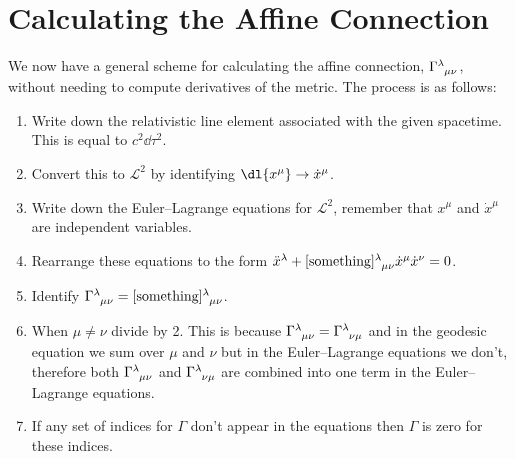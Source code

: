 \documentclass[fleqn]{NotesClass}
\newcommand*{\christoffel}[3]{\tensor{\Gamma}{^{#1}_{{#2}{#3}}}}
\newcommand*{\lagrangian}{\mathcal{L}}
\begin{document}
    \section{Calculating the Affine Connection}
    We now have a general scheme for calculating the affine connection, \(\christoffel{\lambda}{\mu}{\nu}\), without needing to compute derivatives of the metric.
    The process is as follows:
    \begin{enumerate}
        \item Write down the relativistic line element associated with the given spacetime.
        This is equal to \(c^2\dd{\tau}^2\).
        \item Convert this to \(\lagrangian^2\) by identifying \(\dl{x^\mu} \to \dot{x}^\mu\).
        \item Write down the Euler--Lagrange equations for \(\lagrangian^2\), remember that \(x^\mu\) and \(\dot{x}^\mu\) are independent variables.
        \item Rearrange these equations to the form \(\ddot{x}^\lambda + \tensor{[\text{something}]}{^\lambda_{\mu\nu}} \dot{x}^\mu \dot{x}^\nu = 0\).
        \item Identify \(\christoffel{\lambda}{\mu}{\nu} = \tensor{[\text{something}]}{^\lambda_{\mu\nu}}\).
        \item When \(\mu \ne \nu\) divide by 2.
        This is because \(\christoffel{\lambda}{\mu}{\nu} = \christoffel{\lambda}{\nu}{\mu}\) and in the geodesic equation we sum over \(\mu\) and \(\nu\) but in the Euler--Lagrange equations we don't, therefore both \(\christoffel{\lambda}{\mu}{\nu}\) and \(\christoffel{\lambda}{\nu}{\mu}\) are combined into one term in the Euler--Lagrange equations.
        \item If any set of indices for \(\Gamma\) don't appear in the equations then \(\Gamma\) is zero for these indices.
    \end{enumerate}
    
\end{document}
